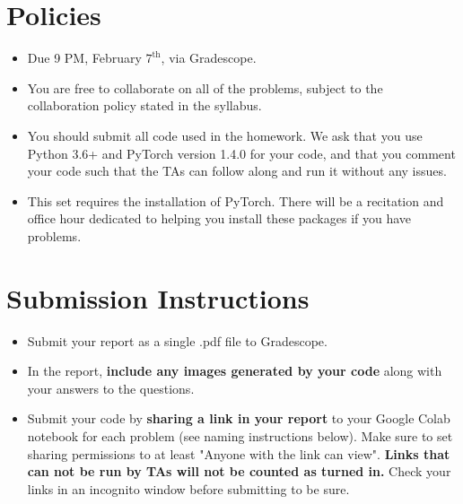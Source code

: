 \newif\ifshowsolutions
\showsolutionstrue

% 







\pagestyle{fancy}




\section*{Policies}
\begin{itemize}
  \item Due 9 PM, February $7^\text{th}$, via Gradescope.
  \item You are free to collaborate on all of the problems, subject to the collaboration policy stated in the syllabus.
  \item You should submit all code used in the homework. We ask that you use Python 3.6+ and PyTorch version 1.4.0 for your code, and that you comment your code such that the TAs can follow along and run it without any issues.
    \item This set requires the installation of PyTorch. There will be a recitation and office hour dedicated to helping you install these packages if you have problems.
\end{itemize}

\section*{Submission Instructions}
\begin{itemize}
  \item Submit your report as a single .pdf file to Gradescope.
  \item In the report, \textbf{include any images generated by your code} along with your answers to the questions.
  \item Submit your code by \textbf{sharing a link in your report} to your Google Colab notebook for each problem (see naming instructions below). Make sure to set sharing permissions to at least "Anyone with the link can view". \textbf{Links that can not be run by TAs will not be counted as turned in.} Check your links in an incognito window before submitting to be sure. 
\end{itemize}

